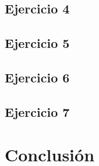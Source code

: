 \documentclass[10pt, a4paper]{article}
\begin{document}
\subsection{Ejercicio 4}
\subsection{Ejercicio 5}
\subsection{Ejercicio 6}
\subsection{Ejercicio 7}

\section{Conclusi\'on}
\end{document}
